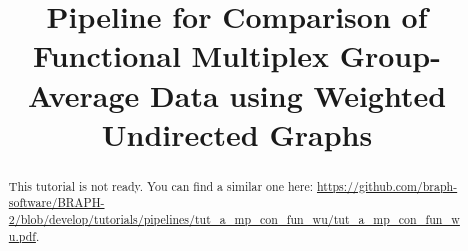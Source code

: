 \documentclass[justified]{tufte-handout}
\title[Comparison of Functional Multiplex Group-Average Data using WU]{Pipeline for Comparison of Functional Multiplex Group-Average Data using Weighted Undirected Graphs}
\begin{document}
\maketitle

\begin{abstract}
\noindent
This tutorial is not ready. You can find a similar one here: \url{https://github.com/braph-software/BRAPH-2/blob/develop/tutorials/pipelines/tut_a_mp_con_fun_wu/tut_a_mp_con_fun_wu.pdf}.
\end{abstract}
\end{document}
